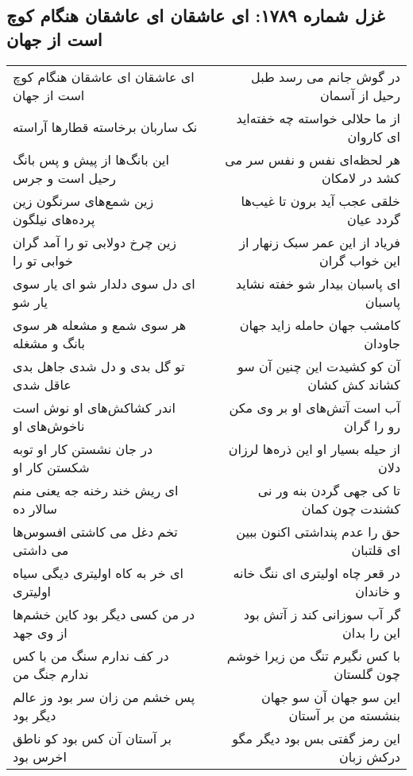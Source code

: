 \begin{center}
\section*{غزل شماره ۱۷۸۹: ای عاشقان ای عاشقان هنگام کوچ است از جهان}
\label{sec:1789}
\begin{longtable}{l p{0.5cm} r}
ای عاشقان ای عاشقان هنگام کوچ است از جهان
&&
در گوش جانم می رسد طبل رحیل از آسمان
\\
نک ساربان برخاسته قطارها آراسته
&&
از ما حلالی خواسته چه خفته‌اید ای کاروان
\\
این بانگ‌ها از پیش و پس بانگ رحیل است و جرس
&&
هر لحظه‌ای نفس و نفس سر می کشد در لامکان
\\
زین شمع‌های سرنگون زین پرده‌های نیلگون
&&
خلقی عجب آید برون تا غیب‌ها گردد عیان
\\
زین چرخ دولابی تو را آمد گران خوابی تو را
&&
فریاد از این عمر سبک زنهار از این خواب گران
\\
ای دل سوی دلدار شو ای یار سوی یار شو
&&
ای پاسبان بیدار شو خفته نشاید پاسبان
\\
هر سوی شمع و مشعله هر سوی بانگ و مشغله
&&
کامشب جهان حامله زاید جهان جاودان
\\
تو گل بدی و دل شدی جاهل بدی عاقل شدی
&&
آن کو کشیدت این چنین آن سو کشاند کش کشان
\\
اندر کشاکش‌های او نوش است ناخوش‌های او
&&
آب است آتش‌های او بر وی مکن رو را گران
\\
در جان نشستن کار او توبه شکستن کار او
&&
از حیله بسیار او این ذره‌ها لرزان دلان
\\
ای ریش خند رخنه جه یعنی منم سالار ده
&&
تا کی جهی گردن بنه ور نی کشندت چون کمان
\\
تخم دغل می کاشتی افسوس‌ها می داشتی
&&
حق را عدم پنداشتی اکنون ببین ای قلتبان
\\
ای خر به کاه اولیتری دیگی سیاه اولیتری
&&
در قعر چاه اولیتری ای ننگ خانه و خاندان
\\
در من کسی دیگر بود کاین خشم‌ها از وی جهد
&&
گر آب سوزانی کند ز آتش بود این را بدان
\\
در کف ندارم سنگ من با کس ندارم جنگ من
&&
با کس نگیرم تنگ من زیرا خوشم چون گلستان
\\
پس خشم من زان سر بود وز عالم دیگر بود
&&
این سو جهان آن سو جهان بنشسته من بر آستان
\\
بر آستان آن کس بود کو ناطق اخرس بود
&&
این رمز گفتی بس بود دیگر مگو درکش زبان
\\
\end{longtable}
\end{center}
